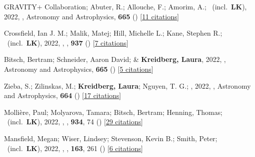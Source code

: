 \item[{\color{numcolor}\scriptsize70}] GRAVITY+ Collaboration; Abuter, R.; Allouche, F.; Amorim, A.; \etal\ (incl.\ \textbf{LK}), 2022, , Astronomy and Astrophysics, \textbf{665} () [\href{https://ui.adsabs.harvard.edu/abs/2022A&A...665A..75G}{11 citations}]

\item[{\color{numcolor}\scriptsize69}] Crossfield, Ian J. M.; Malik, Matej; Hill, Michelle L.; Kane, Stephen R.; \etal\ (incl.\ \textbf{LK}), 2022, , \apj, \textbf{937} () [\href{https://ui.adsabs.harvard.edu/abs/2022ApJ...937L..17C}{7 citations}]

\item[{\color{numcolor}\scriptsize68}] Bitsch, Bertram; Schneider, Aaron David; \& \textbf{Kreidberg, Laura}, 2022, , Astronomy and Astrophysics, \textbf{665} () [\href{https://ui.adsabs.harvard.edu/abs/2022A&A...665A.138B}{5 citations}]

\item[{\color{numcolor}\scriptsize67}] Zieba, S.; Zilinskas, M.; \textbf{Kreidberg, Laura}; Nguyen, T. G.; \etal, 2022, , Astronomy and Astrophysics, \textbf{664} () [\href{https://ui.adsabs.harvard.edu/abs/2022A&A...664A..79Z}{17 citations}]

\item[{\color{numcolor}\scriptsize66}] Molli{\`e}re, Paul; Molyarova, Tamara; Bitsch, Bertram; Henning, Thomas; \etal\ (incl.\ \textbf{LK}), 2022, , \apj, \textbf{934}, 74 () [\href{https://ui.adsabs.harvard.edu/abs/2022ApJ...934...74M}{29 citations}]

\item[{\color{numcolor}\scriptsize65}] Mansfield, Megan; Wiser, Lindsey; Stevenson, Kevin B.; Smith, Peter; \etal\ (incl.\ \textbf{LK}), 2022, , \aj, \textbf{163}, 261 () [\href{https://ui.adsabs.harvard.edu/abs/2022AJ....163..261M}{6 citations}]

